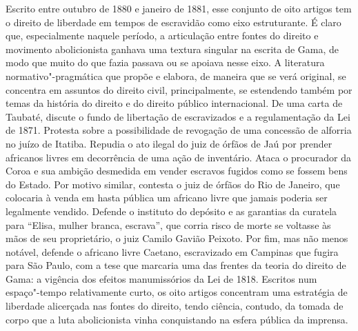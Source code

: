 {\small\noindent
Escrito entre outubro de 1880 e janeiro de 1881, esse conjunto de
oito artigos tem o direito de liberdade em tempos de escravidão como
eixo estruturante. É claro que, especialmente naquele período, a
articulação entre fontes do direito e movimento abolicionista ganhava
uma textura singular na escrita de Gama, de modo que muito do que fazia
passava ou se apoiava nesse eixo. A literatura normativo"-pragmática que
propõe e elabora, de maneira que se verá original, se concentra em
assuntos do direito civil, principalmente, se estendendo também por
temas da história do direito e do direito público internacional. De uma
carta de Taubaté, discute o fundo de libertação de escravizados e a
regulamentação da Lei de 1871. Protesta sobre a possibilidade de
revogação de uma concessão de alforria no juízo de Itatiba. Repudia o
ato ilegal do juiz de órfãos de Jaú por prender africanos livres em
decorrência de uma ação de inventário. Ataca o procurador da Coroa e sua
ambição desmedida em vender escravos fugidos como se fossem bens do
Estado. Por motivo similar, contesta o juiz de órfãos do Rio de Janeiro,
que colocaria à venda em hasta pública um africano livre que jamais
poderia ser legalmente vendido. Defende o instituto do depósito e as
garantias da curatela para ``Elisa, mulher branca, escrava'', que corria
risco de morte se voltasse às mãos de seu proprietário, o juiz Camilo
Gavião Peixoto. Por fim, mas não menos notável, defende o africano
livre Caetano, escravizado em Campinas que fugira para São Paulo, com a
tese que marcaria uma das frentes da teoria do direito de Gama: a
vigência dos efeitos manumissórios da Lei de 1818. Escritos num
espaço"-tempo relativamente curto, os oito artigos concentram uma
estratégia de liberdade alicerçada nas fontes do direito, tendo ciência,
contudo, da tomada de corpo que a luta abolicionista vinha conquistando
na esfera pública da imprensa.}
\@openrighttrue\makeatother \endgroup

\paginabranca
\mbox{}\vfill
\thispagestyle{empty}

